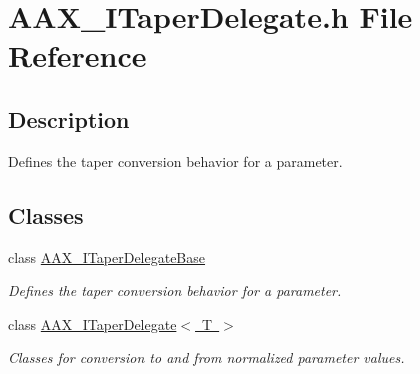 \hypertarget{a00638}{}\section{A\+A\+X\+\_\+\+I\+Taper\+Delegate.\+h File Reference}
\label{a00638}


\subsection{Description}
Defines the taper conversion behavior for a parameter. 

\subsection*{Classes}
\begin{DoxyCompactItemize}
\item 
class \mbox{\hyperlink{a01877}{A\+A\+X\+\_\+\+I\+Taper\+Delegate\+Base}}
\begin{DoxyCompactList}\small\item\em Defines the taper conversion behavior for a parameter. \end{DoxyCompactList}\item 
class \mbox{\hyperlink{a01881}{A\+A\+X\+\_\+\+I\+Taper\+Delegate$<$ T $>$}}
\begin{DoxyCompactList}\small\item\em Classes for conversion to and from normalized parameter values. \end{DoxyCompactList}\end{DoxyCompactItemize}
